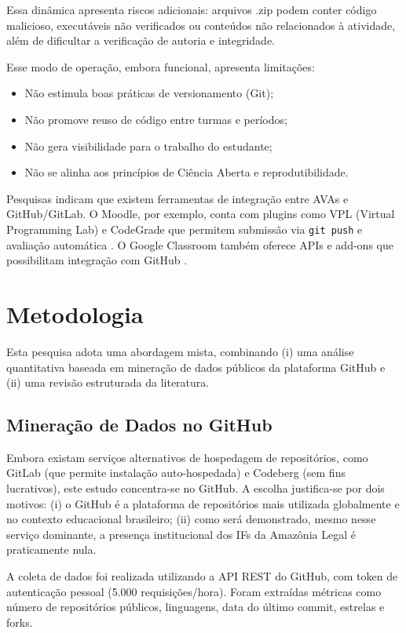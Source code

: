 \documentclass[english, spanish, brazilian]{RBIEarticle}
\begin{document}
Essa dinâmica apresenta riscos adicionais: arquivos .zip podem conter código malicioso, executáveis não verificados ou conteúdos não relacionados à atividade, além de dificultar a verificação de autoria e integridade.

Esse modo de operação, embora funcional, apresenta limitações:
\begin{itemize}
\item Não estimula boas práticas de versionamento (Git);
\item Não promove reuso de código entre turmas e períodos;
\item Não gera visibilidade para o trabalho do estudante;
\item Não se alinha aos princípios de Ciência Aberta e reprodutibilidade.
\end{itemize}

Pesquisas indicam que existem ferramentas de integração entre AVAs e GitHub/GitLab. O Moodle, por exemplo, conta com plugins como VPL (Virtual Programming Lab) e CodeGrade que permitem submissão via \texttt{git push} e avaliação automática \cite{moodle2024}. O Google Classroom também oferece APIs e add-ons que possibilitam integração com GitHub \cite{google2024}.


\section{Metodologia}

Esta pesquisa adota uma abordagem mista, combinando (i) uma análise quantitativa baseada em mineração de dados públicos da plataforma GitHub e (ii) uma revisão estruturada da literatura.

\subsection{Mineração de Dados no GitHub}

Embora existam serviços alternativos de hospedagem de repositórios, como GitLab (que permite instalação auto-hospedada) e Codeberg (sem fins lucrativos), este estudo concentra-se no GitHub. A escolha justifica-se por dois motivos: (i) o GitHub é a plataforma de repositórios mais utilizada globalmente e no contexto educacional brasileiro; (ii) como será demonstrado, mesmo nesse serviço dominante, a presença institucional dos IFs da Amazônia Legal é praticamente nula.

A coleta de dados foi realizada utilizando a API REST do GitHub, com token de autenticação pessoal (5.000 requisições/hora). Foram extraídas métricas como número de repositórios públicos, linguagens, data do último commit, estrelas e forks.
\end{document}
